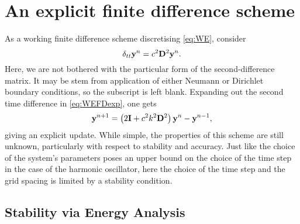 \documentclass[11pt,twoside,a4paper,english]{book}
\newcommand{\dtt}{\delta_{tt}}
\begin{document}
\section{An explicit finite difference scheme}

As a working finite difference scheme discretising \eqref{eq:WE}, consider
\begin{equation}\label{eq:WEFDexp}
\dtt {\bf y}^n = c^2 {\bf D}^2 {\bf y}^n.
\end{equation}
Here, we are not bothered with the particular form of the second-difference matrix. It may be stem from application of either Neumann or Dirichlet boundary conditions, so the subscript is left blank. 
Expanding out the second time difference in \eqref{eq:WEFDexp}, one gets
\begin{equation}
{\bf y}^{n+1} = \left(2{\bf I}+c^2k^2{\bf D}^2 \right){\bf y}^n - {\bf y}^{n-1},
\end{equation}
giving an explicit update. While simple, the properties of this scheme are still unknown, particularly with respect to stability and accuracy. Just like the choice of the system's parameters poses an upper bound on the choice of the time step in the case of the harmonic oscillator, here the choice of the time step and the grid spacing is limited by a stability condition. 


\subsection{Stability via Energy Analysis}
 
\end{document}
